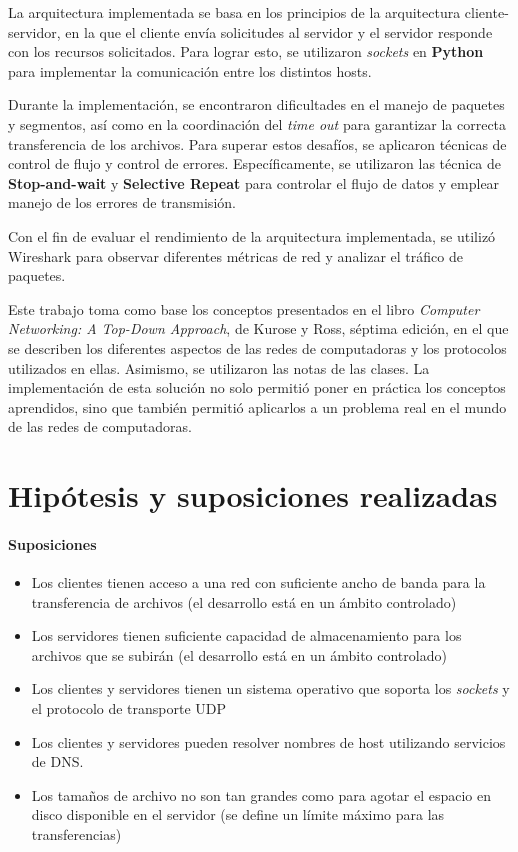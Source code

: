 \documentclass[11pt,a4paper]{article}
\begin{document}
La arquitectura implementada se basa en los principios de la arquitectura cliente-servidor, en la que el cliente envía solicitudes al servidor y el servidor responde con los recursos solicitados. Para lograr esto, se utilizaron \textit{sockets} en \textbf{Python} para implementar la comunicación entre los distintos hosts.

Durante la implementación, se encontraron dificultades en el manejo de paquetes y segmentos, así como en la coordinación del \textit{time out} para garantizar la correcta transferencia de los archivos. Para superar estos desafíos, se aplicaron técnicas de control de flujo y control de errores. Específicamente, se utilizaron las técnica de \textbf{Stop-and-wait} y \textbf{Selective Repeat} para controlar el flujo de datos y emplear manejo de los errores de transmisión.

Con el fin de evaluar el rendimiento de la arquitectura implementada, se utilizó Wireshark para observar diferentes métricas de red y analizar el tráfico de paquetes.

Este trabajo toma como base los conceptos presentados en el libro \textit{Computer Networking: A Top-Down Approach}, de Kurose y Ross, séptima edición, en el que se describen los diferentes aspectos de las redes de computadoras y los protocolos utilizados en ellas. Asimismo, se utilizaron las notas de las clases. La implementación de esta solución no solo permitió poner en práctica los conceptos aprendidos, sino que también permitió aplicarlos a un problema real en el mundo de las redes de computadoras.

\newpage

\section{Hipótesis y suposiciones realizadas}

\paragraph{Suposiciones}
\begin{itemize}
    \item Los clientes tienen acceso a una red con suficiente ancho de banda para la transferencia de archivos (el desarrollo está en un ámbito controlado)
    \item Los servidores tienen suficiente capacidad de almacenamiento para los archivos que se subirán (el desarrollo está en un ámbito controlado)
    \item Los clientes y servidores tienen un sistema operativo que soporta los \textit{sockets} y el protocolo de transporte UDP
    \item Los clientes y servidores pueden resolver nombres de host utilizando servicios de DNS.
    \item Los tamaños de archivo no son tan grandes como para agotar el espacio en disco disponible en el servidor (se define un límite máximo para las transferencias)
    
\end{itemize}
\end{document}
